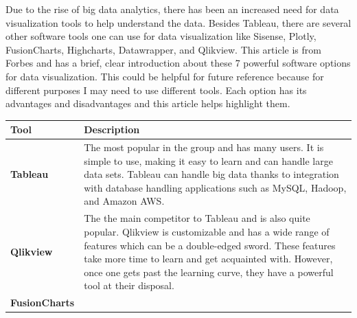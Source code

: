 \documentclass[]{book}
\theoremstyle{definition}
\theoremstyle{definition}
\theoremstyle{definition}
\theoremstyle{remark}
\begin{document}
Due to the rise of big data analytics, there has been an increased need
for data visualization tools to help understand the data. Besides
Tableau, there are several other software tools one can use for data
visualization like Sisense, Plotly, FusionCharts, Highcharts,
Datawrapper, and Qlikview. This article is from Forbes and has a brief,
clear introduction about these 7 powerful software options for data
visualization. This could be helpful for future reference because for
different purposes I may need to use different tools. Each option has
its advantages and disadvantages and this article helps highlight them.

\begin{longtable}[]{@{}ll@{}}
\toprule
\begin{minipage}[b]{0.16\columnwidth}\raggedright\strut
\textbf{Tool}\strut
\end{minipage} & \begin{minipage}[b]{0.78\columnwidth}\raggedright\strut
\textbf{Description}\strut
\end{minipage}\tabularnewline
\midrule
\endhead
\begin{minipage}[t]{0.16\columnwidth}\raggedright\strut
\textbf{Tableau}\strut
\end{minipage} & \begin{minipage}[t]{0.78\columnwidth}\raggedright\strut
The most popular in the group and has many users. It is simple to use,
making it easy to learn and can handle large data sets. Tableau can
handle big data thanks to integration with database handling
applications such as MySQL, Hadoop, and Amazon AWS.\strut
\end{minipage}\tabularnewline
\begin{minipage}[t]{0.16\columnwidth}\raggedright\strut
\textbf{Qlikview}\strut
\end{minipage} & \begin{minipage}[t]{0.78\columnwidth}\raggedright\strut
The the main competitor to Tableau and is also quite popular. Qlikview
is customizable and has a wide range of features which can be a
double-edged sword. These features take more time to learn and get
acquainted with. However, once one gets past the learning curve, they
have a powerful tool at their disposal.\strut
\end{minipage}\tabularnewline
\begin{minipage}[t]{0.16\columnwidth}\raggedright\strut
\textbf{FusionCharts}\strut
\end{minipage} & \begin{minipage}[t]{0.78\columnwidth}\raggedright\strut

\end{minipage}
\end{longtable}
\end{document}
